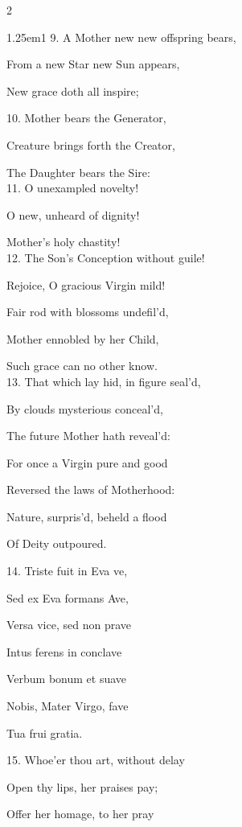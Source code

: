 \begin{multicols}{2}
\begin{hangparas}{1.25em}{1}
9. A Mother new new offspring bears,

From a new Star new Sun appears,

New grace doth all inspire;%

\newcolumn

10. Mother bears the Generator,

Creature brings forth the Creator,

The Daughter bears the Sire:\\

11. O unexampled novelty!

O new, unheard of dignity!

Mother's holy chastity!\\

12. The Son's Conception without guile!

Rejoice, O gracious Virgin mild!

Fair rod with blossoms undefil'd,

Mother ennobled by her Child,

Such grace can no other know.\\

13. That which lay hid, in figure seal'd,

By clouds mysterious conceal'd,

The future Mother hath reveal'd:

For once a Virgin pure and good

Reversed the laws of Motherhood:

Nature, surpris'd, beheld a flood

Of Deity outpoured.\\


14. Triste fuit in Eva ve,

Sed ex Eva formans Ave,

Versa vice, sed non prave

Intus ferens in conclave

Verbum bonum et suave

Nobis, Mater Virgo, fave

Tua frui gratia.\\


15. Whoe'er thou art, without delay

Open thy lips, her praises pay;

Offer her homage, to her pray


\end{hangparas}
\end{multicols}
